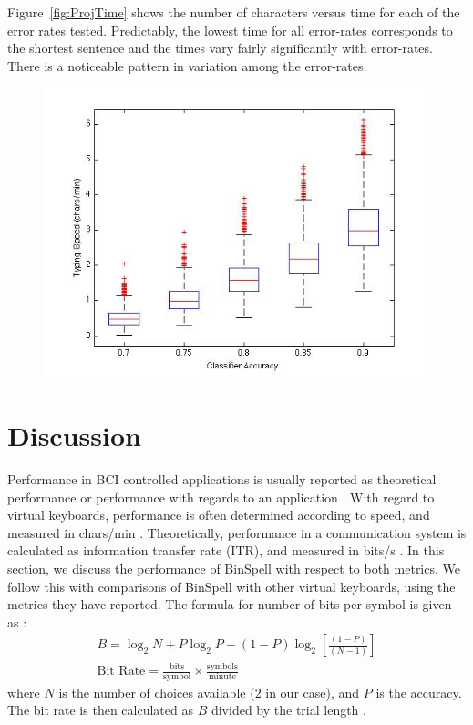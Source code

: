\documentclass[12pt,titlepage]{article}
\begin{document}
Figure~\ref{fig:ProjTime} shows the number of characters versus time for each of the error rates tested. 
Predictably, the lowest time for all error-rates corresponds to the shortest sentence and the 
times vary fairly significantly with error-rates.  There is a noticeable pattern in variation among 
the error-rates.

\begin{figure}[t]
\begin{center}
	\includegraphics[scale=0.40]{ProjTypeSpeedComp.jpg}
	\label{fig:TypeSpeed}
\end{center}
\end{figure}

\section{Discussion}

Performance in BCI controlled applications is usually reported as theoretical performance or performance with regards to an application \cite{wolpaw_braincomputer_2002}.  With regard to virtual keyboards, performance is often determined according to speed, and measured in chars/min \cite{blankertz_berlin_2006} \cite{donchin_mental_2000} \cite{wolpaw_braincomputer_2002}.  Theoretically, performance in a communication system is calculated as information transfer rate (ITR), and measured in bits/s \cite{wolpaw_braincomputer_2002}.  In this section, we discuss the performance of BinSpell with respect to both metrics.  We follow this with comparisons of BinSpell with other virtual keyboards, using the metrics they have reported.  The formula for number of bits per symbol is given as \cite{mcfarland2003brain}\cite{kelly_visual_2005}:
\begin{gather*}
	B = \log_2 N + P \log_2P + (1-P)\log_2\left[\frac{(1-P)}{(N-1)}\right] \tag{7}\\
	\text{Bit Rate} = \frac{\text{bits}}{\text{symbol}} \times \frac{\text{symbols}}{\text{minute}} \tag{8}
\end{gather*}
where $N$ is the number of choices available ($2$ in our case), and $P$ is the accuracy.  The bit rate is then calculated as $B$ divided by the trial length \cite{wolpaw_braincomputer_2002}\cite{mcfarland2003brain}\cite{kelly_visual_2005}.
\end{document}
